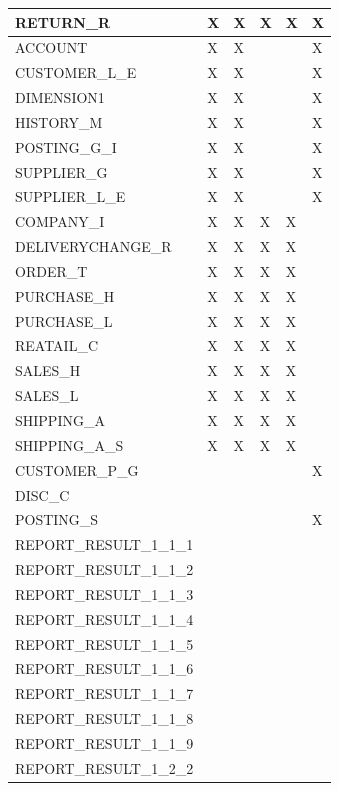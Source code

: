 \documentclass{cslthse-msc}
\begin{document}
\begin{appendices}
\begin{table}[H]
{\begin{tabular}{ l | p{5em} | p{5em}| p{5em}| p{5em}| l  }
	 RETURN\_R & X & X & X & X & X \\ \hline
	 ACCOUNT & X & X &  &  & X \\ \hline
	 CUSTOMER\_L\_E & X & X &  &  & X \\ \hline
	 DIMENSION1 & X & X &  &  & X \\ \hline
	 HISTORY\_M & X & X &  &  & X \\ \hline
	 POSTING\_G\_I& X & X &  &  & X \\ \hline
	 SUPPLIER\_G & X & X &  &  & X \\ \hline
	 SUPPLIER\_L\_E & X & X &  &  & X \\ \hline
	 COMPANY\_I & X & X & X & X &  \\ \hline
	 DELIVERYCHANGE\_R & X & X & X & X &  \\ \hline
	 ORDER\_T & X & X & X & X &  \\ \hline
	 PURCHASE\_H & X & X & X & X &  \\ \hline
	 PURCHASE\_L & X & X & X & X &  \\ \hline
	 REATAIL\_C & X & X & X & X &  \\ \hline
	 SALES\_H & X & X & X & X &  \\ \hline
	 SALES\_L & X & X & X & X &  \\ \hline
	 SHIPPING\_A & X & X & X & X &  \\ \hline
	 SHIPPING\_A\_S & X & X & X & X &  \\ \hline
	 CUSTOMER\_P\_G &  &  &  &  & X \\ \hline
	 DISC\_C &  &  &  &  &  \\ \hline
	 POSTING\_S &  &  &  &  & X \\ \hline
	 REPORT\_RESULT\_1\_1\_1 &  &  &  &  &  \\ \hline
	 REPORT\_RESULT\_1\_1\_2 &  &  &  &  &  \\ \hline
	 REPORT\_RESULT\_1\_1\_3 &  &  &  &  &  \\ \hline
	 REPORT\_RESULT\_1\_1\_4 &  &  &  &  &  \\ \hline
	 REPORT\_RESULT\_1\_1\_5 &  &  &  &  &  \\ \hline
	 REPORT\_RESULT\_1\_1\_6 &  &  &  &  &  \\ \hline
	 REPORT\_RESULT\_1\_1\_7 &  &  &  &  &  \\ \hline
	 REPORT\_RESULT\_1\_1\_8 &  &  &  &  &  \\ \hline
	 REPORT\_RESULT\_1\_1\_9 &  &  &  &  &  \\ \hline
	 REPORT\_RESULT\_1\_2\_2 &  &  &  &  &  \\ \hline

\end{tabular}}
\end{table}
\end{appendices}
\end{document}
